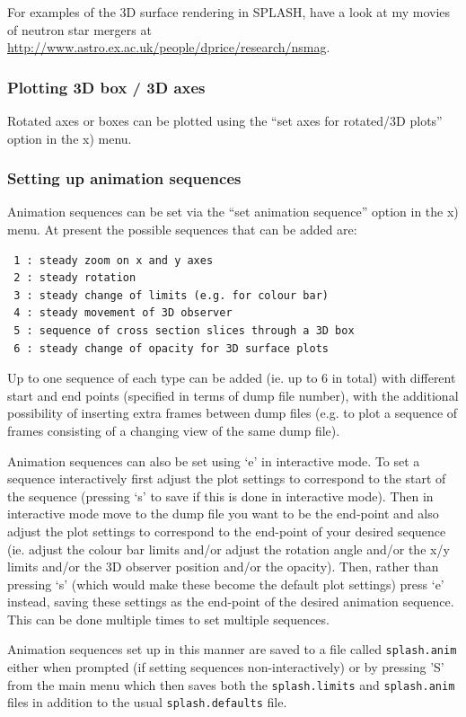 \documentclass[a4paper,11pt]{article}
\begin{document}
 For examples of the 3D surface rendering in SPLASH, have a look at my movies of neutron star mergers at \url{http://www.astro.ex.ac.uk/people/dprice/research/nsmag}.

\subsubsection{ Plotting 3D box / 3D axes}
Rotated axes or boxes can be plotted using the ``set axes for rotated/3D plots'' option in the x) menu.

\subsubsection{ Setting up animation sequences}
\label{sec:animseq}
 Animation sequences can be set via the ``set animation sequence'' option in the x) menu. At present the possible sequences that can be added are:
\begin{verbatim}
 1 : steady zoom on x and y axes                       
 2 : steady rotation                                   
 3 : steady change of limits (e.g. for colour bar)     
 4 : steady movement of 3D observer                    
 5 : sequence of cross section slices through a 3D box 
 6 : steady change of opacity for 3D surface plots
\end{verbatim}
 Up to one sequence of each type can be added (ie. up to 6 in total) with different start and end points (specified in terms of dump file number), with the additional possibility of inserting extra frames between dump files (e.g. to plot a sequence of frames consisting of a changing view of the same dump file). 

 Animation sequences can also be set using `e' in interactive mode. To set a sequence interactively first adjust the plot settings to correspond to the start of the sequence (pressing `s' to save if this is done in interactive mode). Then in interactive mode move to the dump file you want to be the end-point and also adjust the plot settings to correspond to the end-point of your desired sequence (ie. adjust the colour bar limits and/or adjust the rotation angle and/or the x/y limits and/or the 3D observer position and/or the opacity). Then, rather than pressing `s' (which would make these become the default plot settings) press `e' instead, saving these settings as the end-point of the desired animation sequence. This can be done multiple times to set multiple sequences.
 
  Animation sequences set up in this manner are saved to a file called \verb+splash.anim+ either when prompted (if setting sequences non-interactively) or by pressing 'S' from the main menu which then saves both the \verb+splash.limits+ and \verb+splash.anim+ files in addition to the usual \verb+splash.defaults+ file.
\end{document}
